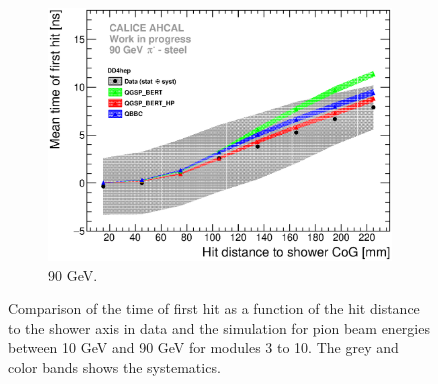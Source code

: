\begin{figure}[htbp!]
\begin{subfigure}[t]{0.49\textwidth}
    \includegraphics[width=1\textwidth]{../Thesis_Plots/Timing/Pions/Plots/ComparisonToSim/Time_Radius_90GeV_SSF_DD4hep.eps}
    \caption{90 GeV.} \label{fig:Radius_SSF_SimData_90GeV_DD4hep}
  \end{subfigure}
  \caption{Comparison of the time of first hit as a function of the hit distance to the shower axis in data and the \ddhep simulation for pion beam energies between 10 GeV and 90 GeV for modules 3 to 10. The grey and color bands shows the systematics.}
\end{figure}

